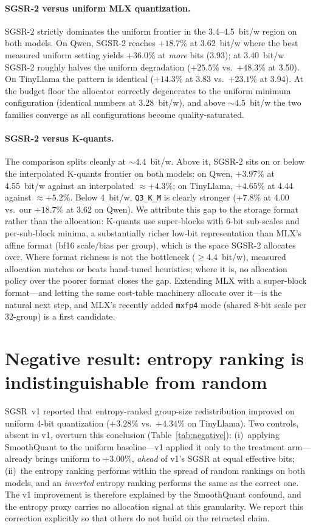 \documentclass{article}
\begin{document}
\paragraph{SGSR-2 versus uniform MLX quantization.}
SGSR-2 strictly dominates the uniform frontier in the 3.4--4.5~bit/w
region on both models. On Qwen, SGSR-2 reaches $+18.7\%$ at 3.62~bit/w
where the best measured uniform setting yields $+36.0\%$ at
\emph{more} bits (3.93); at 3.40~bit/w SGSR-2 roughly halves the uniform
degradation ($+25.5\%$ vs.\ $+48.3\%$ at 3.50). On TinyLlama the pattern is
identical ($+14.3\%$ at 3.83 vs.\ $+23.1\%$ at 3.94). At the budget floor
the allocator correctly degenerates to the uniform minimum configuration
(identical numbers at 3.28~bit/w), and above ${\sim}4.5$~bit/w the two
families converge as all configurations become quality-saturated.

\paragraph{SGSR-2 versus K-quants.}
The comparison splits cleanly at ${\sim}4.4$~bit/w. Above it, SGSR-2 sits
on or below the interpolated K-quants frontier on both models: on Qwen,
$+3.97\%$ at 4.55~bit/w against an interpolated ${\approx}+4.3\%$; on
TinyLlama, $+4.65\%$ at 4.44 against ${\approx}+5.2\%$. Below 4~bit/w,
\texttt{Q3\_K\_M} is clearly stronger ($+7.8\%$ at 4.00 vs.\ our $+18.7\%$
at 3.62 on Qwen). We attribute this gap to the storage format rather than
the allocation: K-quants use super-blocks with 6-bit sub-scales and
per-sub-block minima, a substantially richer low-bit representation than
MLX's affine format (bf16 scale/bias per group), which is the space SGSR-2
allocates over. Where format richness is not the bottleneck
($\geq$4.4~bit/w), measured allocation matches or beats hand-tuned
heuristics; where it is, no allocation policy over the poorer format
closes the gap. Extending MLX with a super-block format---and letting the
same cost-table machinery allocate over it---is the natural next step, and
MLX's recently added \texttt{mxfp4} mode (shared 8-bit scale per 32-group)
is a first candidate.

\section{Negative result: entropy ranking is indistinguishable from random}
\label{sec:negative}

SGSR~v1 reported that entropy-ranked group-size redistribution improved on
uniform 4-bit quantization ($+3.28\%$ vs.\ $+4.34\%$ on TinyLlama). Two
controls, absent in v1, overturn this conclusion
(Table~\ref{tab:negative}): (i)~applying SmoothQuant to the uniform
baseline---v1 applied it only to the treatment arm---already brings uniform
to $+3.00\%$, \emph{ahead} of v1's SGSR at equal effective bits; (ii)~the
entropy ranking performs within the spread of random rankings on both
models, and an \emph{inverted} entropy ranking performs the same as the
correct one. The v1 improvement is therefore explained by the SmoothQuant
confound, and the entropy proxy carries no allocation signal at this
granularity. We report this correction explicitly so that others do not
build on the retracted claim.
\end{document}
